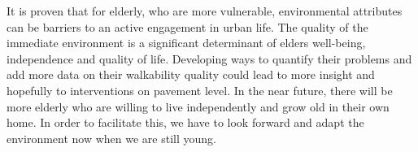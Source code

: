 It is proven that for elderly, who are more vulnerable, environmental attributes can be barriers to an active engagement in urban life. The quality of the immediate environment is a significant determinant of elders well-being, independence and quality of life. Developing ways to quantify their problems and add more data on their walkability quality could lead to more insight and hopefully to interventions on pavement level. In the near future, there will be more elderly who are willing to live independently and grow old in their own home. In order to facilitate this, we have to look forward and adapt the environment now when we are still young. 









 

